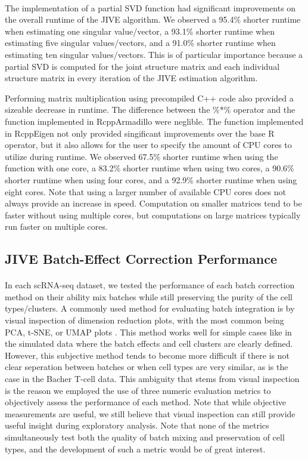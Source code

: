 \documentclass[
12pt, %
letterpaper, %
oneside, %
headinclude,footinclude, %
BCOR5mm, %
]{scrartcl}
\begin{document}
\paragraph*{}
The implementation of a partial SVD function had significant improvements on the overall runtime of the JIVE algorithm. We observed a 95.4\% shorter runtime when estimating one singular value/vector, a 93.1\% shorter runtime when estimating five singular values/vectors, and a 91.0\% shorter runtime when estimating ten singular values/vectors. This is of particular importance because a partial SVD is computed for the joint structure matrix and each individual structure matrix in every iteration of the JIVE estimation algorithm.

Performing matrix multiplication using precompiled C++ code also provided a sizeable decrease in runtime. The difference between the \%*\% operator and the function implemented in RcppArmadillo were neglible. The function implemented in RcppEigen not only provided singificant improvements over the base R operator, but it also allows for the user to specify the amount of CPU cores to utilize during runtime. We observed 67.5\% shorter runtime when using the function with one core, a 83.2\% shorter runtime when using two cores, a 90.6\% shorter runtime when using four cores, and a 92.9\% shorter runtime when using eight cores. Note that using a larger number of available CPU cores does not always provide an increase in speed. Computation on smaller matrices tend to be faster without using multiple cores, but computations on large matrices typically run faster on multiple cores.

\subsection{JIVE Batch-Effect Correction Performance}

\paragraph*{}
In each scRNA-seq dataset, we tested the performance of each batch correction method on their ability mix batches while still preserving the purity of the cell types/clusters. A commonly used method for evaluating batch integration is by visual inspection of dimension reduction plots, with the most common being PCA, t-SNE, or UMAP plots \citep{tran2020benchmark}. This method works well for simple cases like in the simulated data where the batch effects and cell clusters are clearly defined. However, this subjective method tends to become more difficult if there is not clear seperation between batches or when cell types are very similar, as is the case in the Bacher T-cell data. This ambiguity that stems from visual inspection is the reason we employed the use of three numeric evaluation metrics to objectively assess the performance of each method. Note that while objective measurements are useful, we still believe that visual inspection can still provide useful insight during exploratory analysis. Note that none of the metrics simultaneously test both the quality of batch mixing and preservation of cell types, and the development of such a metric would be of great interest.
\end{document}
